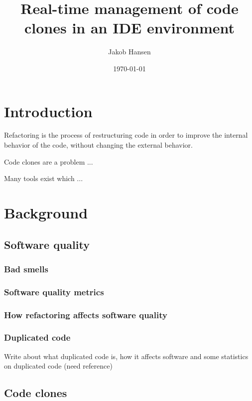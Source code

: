 \documentclass[12pt]{article}
\title{Real-time management of code clones in an IDE environment}
\author{Jakob Hansen}
\date{\today}
\begin{document}
\maketitle

\tableofcontents

\section{Introduction}

Refactoring is the process of restructuring code in order to improve the internal behavior
of the code, without changing the external behavior.\cite{fowlerrefactoring}

Code clones are a problem ...

Many tools exist which ...

\section{Background}

\subsection{Software quality}

\subsubsection{Bad smells}

\subsubsection{Software quality metrics}

\subsubsection{How refactoring affects software quality}

\subsubsection{Duplicated code}

Write about what duplicated code is, how it affects software and some statistics on
duplicated code (need reference)

\subsection{Code clones}
\end{document}
